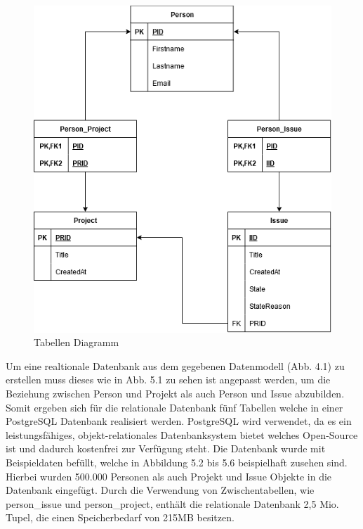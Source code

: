 \begin{figure}[H]
	\centering
	\includegraphics[scale=0.6]{Illustrations/table_diagram.png}
	\caption{Tabellen Diagramm}
\end{figure}
\newpage
\noindent
Um eine realtionale Datenbank aus dem gegebenen Datenmodell (Abb. 4.1) zu erstellen muss dieses wie in Abb. 5.1 zu sehen ist angepasst werden, um die Beziehung zwischen Person und Projekt als auch Person und Issue abzubilden. Somit ergeben sich für die relationale Datenbank fünf Tabellen welche in einer PostgreSQL Datenbank realisiert werden. PostgreSQL wird verwendet, da es ein leistungsfähiges, objekt-relationales Datenbanksystem bietet welches Open-Source ist und dadurch kostenfrei zur Verfügung steht. Die Datenbank wurde mit Beispieldaten befüllt, welche in Abbildung 5.2 bis 5.6 beispielhaft zusehen sind. Hierbei wurden 500.000 Personen als auch Projekt und Issue Objekte in die Datenbank eingefügt. Durch die Verwendung von Zwischentabellen, wie person\_issue und person\_project, enthält die relationale Datenbank 2,5 Mio. Tupel, die einen Speicherbedarf von 215MB besitzen.

